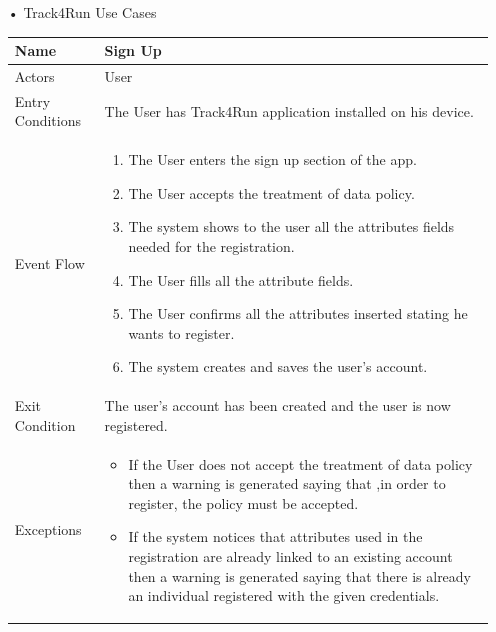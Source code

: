 \begin{enumerate}
\FloatBarrier
\item[•]{\Large Track4Run Use Cases}
\begin{table}[h]
\begin{tabular}{|l|p{}|}
\hline
Name             & Sign Up \\ \hline
Actors           & User  \\ \hline
Entry Conditions & The User has Track4Run application installed on his device.    \\ \hline
Event Flow       & \begin{enumerate}
			\item The User enters the sign up section of the app.
            \item The User accepts the treatment of data policy.
            \item The system shows to the user all the attributes fields needed for the registration.
            \item The User fills all the attribute fields.
            \item The User confirms all the attributes inserted stating he wants to register.
            \item The system creates and saves the user's account.
        \end{enumerate}\\ \hline
Exit Condition   & The user's account has been created and the user is now registered.\\ \hline
Exceptions       & \begin{itemize}
\item If the User does not accept the treatment of data policy then a warning is generated saying that ,in order to register, the policy must be accepted.
\item If the system notices that attributes used in the registration are already linked to an existing account then a warning is generated saying that there is already an individual registered with the given credentials.
\end{itemize}\\ \hline
\end{tabular}
\end{table}
\FloatBarrier


\end{enumerate}
